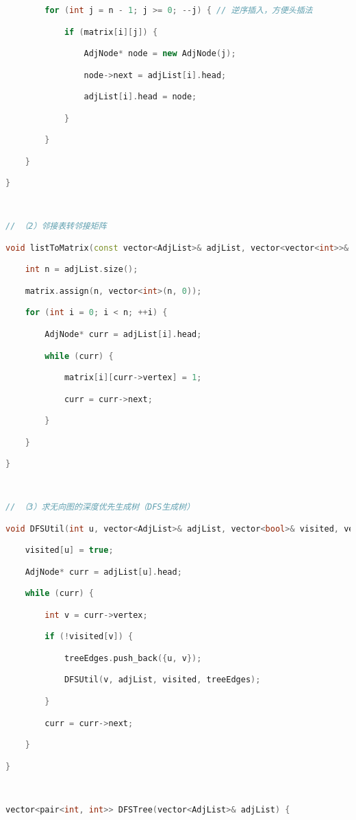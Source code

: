 \begin{lstlisting}[language=C++]
        for (int j = n - 1; j >= 0; --j) { // 逆序插入，方便头插法

            if (matrix[i][j]) {

                AdjNode* node = new AdjNode(j);

                node->next = adjList[i].head;

                adjList[i].head = node;

            }

        }

    }

}

  

// （2）邻接表转邻接矩阵

void listToMatrix(const vector<AdjList>& adjList, vector<vector<int>>& matrix) {

    int n = adjList.size();

    matrix.assign(n, vector<int>(n, 0));

    for (int i = 0; i < n; ++i) {

        AdjNode* curr = adjList[i].head;

        while (curr) {

            matrix[i][curr->vertex] = 1;

            curr = curr->next;

        }

    }

}

  

// （3）求无向图的深度优先生成树（DFS生成树）

void DFSUtil(int u, vector<AdjList>& adjList, vector<bool>& visited, vector<pair<int, int>>& treeEdges) {

    visited[u] = true;

    AdjNode* curr = adjList[u].head;

    while (curr) {

        int v = curr->vertex;

        if (!visited[v]) {

            treeEdges.push_back({u, v});

            DFSUtil(v, adjList, visited, treeEdges);

        }

        curr = curr->next;

    }

}

  

vector<pair<int, int>> DFSTree(vector<AdjList>& adjList) {


\end{lstlisting}
